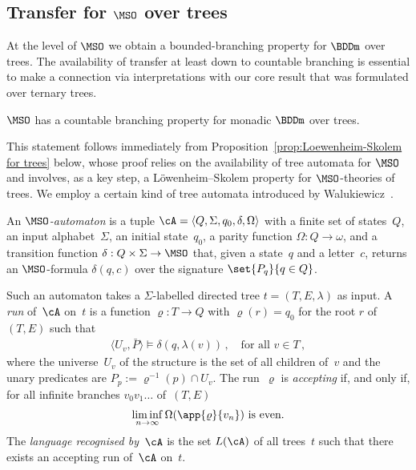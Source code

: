 \documentclass{LMCS}
\begin{document}
\subsection{\boldmath Transfer for $\MSO$ over trees}

At the level of $\MSO$ we obtain a bounded-branching property
for $\BDDm$ over trees. The availability of transfer at least
down to countable branching is essential to make a connection
via interpretations with our core result that was formulated over
ternary trees.

\begin{prop}\label{prop:countable branching property for MSO}
$\MSO$ has a countable branching property for monadic $\BDDm$ over trees.
\end{prop}

This statement follows immediately from
Proposition~\ref{prop:Loewenheim-Skolem for trees} below,
whose proof relies on
the availability of tree automata for $\MSO$ and involves, as a key step,
a L\"owenheim--Skolem property for $\MSO$-theories of trees.
We employ a certain kind
of tree automata introduced by Walukiewicz~\cite{Walukiewicz02}.
\begin{defi}
An \emph{$\MSO$-automaton} is a tuple $\cA = \langle Q,\Sigma,q_0,\delta,\Omega\rangle$
with a finite set of states~$Q$, an input alphabet~$\Sigma$,
an initial state~$q_0$, a parity function $\Omega : Q \to \omega$,
and a transition function $\delta : Q \times \Sigma \to \MSO$
that, given a state~$q$ and a letter~$c$, returns an $\MSO$-formula
$\delta(q,c)$ over the signature $\set{ P_q }{ q \in Q }$.

Such an automaton takes a $\Sigma$-labelled directed tree
$t=(T,E,\lambda)$ as input.
A \emph{run} of~$\cA$ on~$t$ is a function $\varrho : T \to Q$
with $\varrho(r) = q_0$ for the root $r$ of $(T,E)$
such that
\begin{align*}
  \langle U_v,\bar P\rangle \models \delta(q,\lambda(v))\,,
  \quad\text{for all } v \in T\,,
\end{align*}
where the universe~$U_v$ of the structure is the set of all children of~$v$
and the unary predicates are $P_p := \varrho^{-1}(p) \cap U_v$.
The run~$\varrho$ is \emph{accepting}
if, and only if, for all infinite branches $v_0v_1\dots$ of~$(T,E)$
\begin{align*}
  \liminf_{n \to \infty} \Omega(\app{\varrho}{v_n}) \text{ is even.}
\end{align*}
The \emph{language recognised by~$\cA$} is the set $L(\cA)$
of all trees~$t$ such that there exists an accepting run
of~$\cA$ on~$t$.
\end{defi}
\end{document}
